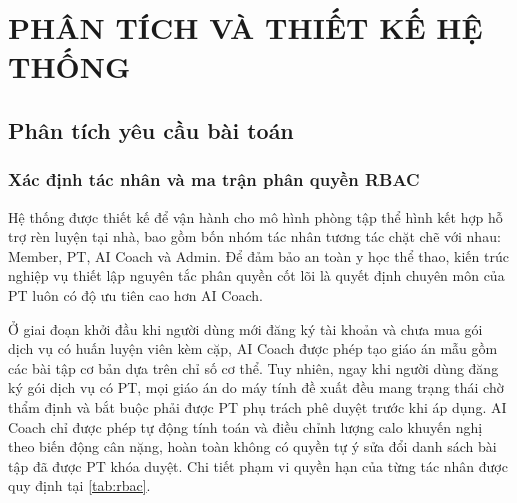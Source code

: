 
\chapter{PHÂN TÍCH VÀ THIẾT KẾ HỆ THỐNG}
\label{chap:thietke}

\section{Phân tích yêu cầu bài toán}
\label{sec:yeucau}

\subsection{Xác định tác nhân và ma trận phân quyền RBAC}
\label{subsec:rbac}

Hệ thống được thiết kế để vận hành cho mô hình phòng tập thể hình kết hợp hỗ trợ rèn luyện tại nhà, bao gồm bốn nhóm tác nhân tương tác chặt chẽ với nhau: Member, PT, AI Coach và Admin. Để đảm bảo an toàn y học thể thao, kiến trúc nghiệp vụ thiết lập nguyên tắc phân quyền cốt lõi là quyết định chuyên môn của PT luôn có độ ưu tiên cao hơn AI Coach.

Ở giai đoạn khởi đầu khi người dùng mới đăng ký tài khoản và chưa mua gói dịch vụ có huấn luyện viên kèm cặp, AI Coach được phép tạo giáo án mẫu gồm các bài tập cơ bản dựa trên chỉ số cơ thể. Tuy nhiên, ngay khi người dùng đăng ký gói dịch vụ có PT, mọi giáo án do máy tính đề xuất đều mang trạng thái chờ thẩm định và bắt buộc phải được PT phụ trách phê duyệt trước khi áp dụng. AI Coach chỉ được phép tự động tính toán và điều chỉnh lượng calo khuyến nghị theo biến động cân nặng, hoàn toàn không có quyền tự ý sửa đổi danh sách bài tập đã được PT khóa duyệt. Chi tiết phạm vi quyền hạn của từng tác nhân được quy định tại \cref{tab:rbac}.

